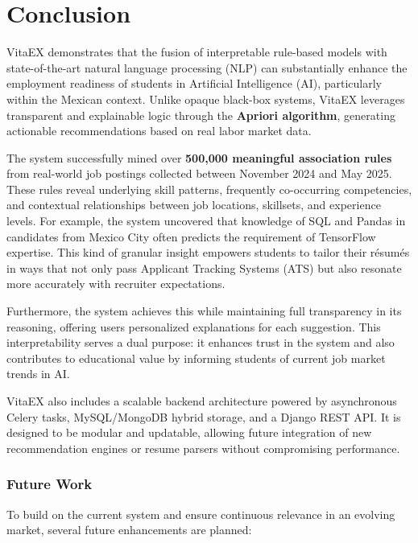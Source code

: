 \documentclass{svproc} %
\begin{document}
	\section{Conclusion}
	
	VitaEX demonstrates that the fusion of interpretable rule-based models with state-of-the-art natural language processing (NLP) can substantially enhance the employment readiness of students in Artificial Intelligence (AI), particularly within the Mexican context. Unlike opaque black-box systems, VitaEX leverages transparent and explainable logic through the \textbf{Apriori algorithm}, generating actionable recommendations based on real labor market data.
	
	The system successfully mined over \textbf{500,000 meaningful association rules} from real-world job postings collected between November 2024 and May 2025. These rules reveal underlying skill patterns, frequently co-occurring competencies, and contextual relationships between job locations, skillsets, and experience levels. For example, the system uncovered that knowledge of SQL and Pandas in candidates from Mexico City often predicts the requirement of TensorFlow expertise. This kind of granular insight empowers students to tailor their résumés in ways that not only pass Applicant Tracking Systems (ATS) but also resonate more accurately with recruiter expectations.
	
	Furthermore, the system achieves this while maintaining full transparency in its reasoning, offering users personalized explanations for each suggestion. This interpretability serves a dual purpose: it enhances trust in the system and also contributes to educational value by informing students of current job market trends in AI.
	
	VitaEX also includes a scalable backend architecture powered by asynchronous Celery tasks, MySQL/MongoDB hybrid storage, and a Django REST API. It is designed to be modular and updatable, allowing future integration of new recommendation engines or resume parsers without compromising performance.
	
	\subsubsection{Future Work}
	
	To build on the current system and ensure continuous relevance in an evolving market, several future enhancements are planned:
	
\end{document}
